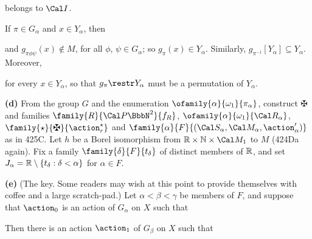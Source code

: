 {\noindent belongs to $\Cal I$.

If $\pi\in G_{\alpha}$ and $x\in Y_{\alpha}$, then


\noindent and $g_{\pi\phi\psi}(x)\notin M$, for all
$\phi$, $\psi\in G_{\alpha}$;  so $g_{\pi}(x)\in Y_{\alpha}$.
Similarly, $g_{\pi^{-1}}[Y_{\alpha}]\subseteq Y_{\alpha}$.
Moreover,


\noindent for every $x\in Y_{\alpha}$, so that $g_{\pi}\restr Y_{\alpha}$
must be a permutation of $Y_{\alpha}$.\ \Qed

\medskip

{\bf (d)} From the group $G$ and the enumeration
$\ofamily{\alpha}{\omega_1}{\pi_{\alpha}}$, construct $\maltese$ and
families $\family{R}{\Cal P\BbbN^2}{f_R}$,
$\ofamily{\alpha}{\omega_1}{\Cal R_{\alpha}}$, 
$\family{\star}{\maltese}{\action^{\star}_r}$ and
$\family{\alpha}{F}{(\Cal S_{\alpha},\Cal M_{\alpha},\action'_{\alpha})}$
as in 425C.   Let $h$ be a Borel isomorphism from
$\Bbb R\times\Bbb N\times\Cal M_1$ to $M$ (424Da again).
Fix a family $\family{\delta}{F}{t_{\delta}}$ of distinct members of
$\Bbb R$, and set $J_{\alpha}=\Bbb R\setminus\{t_{\delta}:\delta<\alpha\}$
for $\alpha\in F$.

\medskip

{\bf (e)} (The key.  Some readers may wish at this point to provide
themselves with
coffee and a large scratch-pad.)  Let $\alpha<\beta<\gamma$ be members of 
$F$, and suppose that
$\action_0$ is an action of $G_{\alpha}$ on $X$ such that


\noindent Then there is an action $\action_1$ of $G_{\beta}$ on $X$ such
that

}
